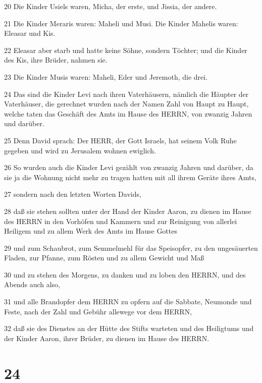 \par 20 Die Kinder Usiels waren, Micha, der erste, und Jissia, der andere.
\par 21 Die Kinder Meraris waren: Maheli und Musi. Die Kinder Mahelis waren: Eleasar und Kis.
\par 22 Eleasar aber starb und hatte keine Söhne, sondern Töchter; und die Kinder des Kis, ihre Brüder, nahmen sie.
\par 23 Die Kinder Musis waren: Maheli, Eder und Jeremoth, die drei.
\par 24 Das sind die Kinder Levi nach ihren Vaterhäusern, nämlich die Häupter der Vaterhäuser, die gerechnet wurden nach der Namen Zahl von Haupt zu Haupt, welche taten das Geschäft des Amts im Hause des HERRN, von zwanzig Jahren und darüber.
\par 25 Denn David sprach: Der HERR, der Gott Israels, hat seinem Volk Ruhe gegeben und wird zu Jerusalem wohnen ewiglich.
\par 26 So wurden auch die Kinder Levi gezählt von zwanzig Jahren und darüber, da sie ja die Wohnung nicht mehr zu tragen hatten mit all ihrem Geräte ihres Amts,
\par 27 sondern nach den letzten Worten Davids,
\par 28 daß sie stehen sollten unter der Hand der Kinder Aaron, zu dienen im Hause des HERRN in den Vorhöfen und Kammern und zur Reinigung von allerlei Heiligem und zu allem Werk des Amts im Hause Gottes
\par 29 und zum Schaubrot, zum Semmelmehl für das Speisopfer, zu den ungesäuerten Fladen, zur Pfanne, zum Rösten und zu allem Gewicht und Maß
\par 30 und zu stehen des Morgens, zu danken und zu loben den HERRN, und des Abends auch also,
\par 31 und alle Brandopfer dem HERRN zu opfern auf die Sabbate, Neumonde und Feste, nach der Zahl und Gebühr allewege vor dem HERRN,
\par 32 daß sie des Dienstes an der Hütte des Stifts warteten und des Heiligtums und der Kinder Aaron, ihrer Brüder, zu dienen im Hause des HERRN.

\chapter{24}

